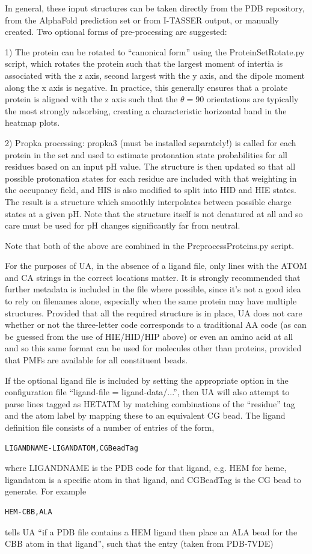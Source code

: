 \documentclass[10pt,a4paper,onecolumn]{report}
\begin{document}
In general, these input structures can be taken directly from the PDB repository, from the AlphaFold prediction set or from I-TASSER output, or manually created. Two optional forms of pre-processing are suggested:

1) The protein can be rotated to ``canonical form'' using the ProteinSetRotate.py script, which rotates the protein such that the largest moment of intertia is associated with the z axis, second largest with the y axis, and the dipole moment along the x axis is negative. In practice, this generally ensures that a prolate protein is aligned with the z axis such that the $\theta = 90$ orientations are typically the most strongly adsorbing, creating a characteristic horizontal band in the heatmap plots. 

2) Propka processing: propka3 (must be installed separately!) is called for each protein in the set and used to estimate protonation state probabilities for all residues based on an input pH value. The structure is then updated so that all possible protonation states for each residue are included with that weighting in the occupancy field, and HIS is also modified to split into HID and HIE states. The result is a structure which smoothly interpolates between possible charge states at a given pH. Note that the structure itself is not denatured at all and so care must be used for pH changes significantly far from neutral. 

Note that both of the above are combined in the PreprocessProteins.py script.

For the purposes of UA, in the absence of a ligand file, only lines with the ATOM and CA strings in the correct locations matter. It is strongly recommended that further metadata is included in the file where possible, since it's not a good idea to rely on filenames alone, especially when the same protein may have multiple structures. Provided that all the required structure is in place, UA does not care whether or not the three-letter code corresponds to a traditional AA code (as can be guessed from the use of HIE/HID/HIP above) or even an amino acid at all and so this same format can be used for molecules other than proteins, provided that PMFs are available for all constituent beads. 

If the optional ligand file is included by setting the appropriate option in the configuration file ``ligand-file = ligand-data/...'', then UA will also attempt to parse lines tagged as HETATM by matching combinations of the ``residue'' tag and the atom label by mapping these to an equivalent CG bead. The ligand definition file consists of a number of entries of the form,
\begin{lstlisting}
LIGANDNAME-LIGANDATOM,CGBeadTag
\end{lstlisting}
where LIGANDNAME is the PDB code for that ligand, e.g. HEM for heme, ligandatom is a specific atom in that ligand, and CGBeadTag is the CG bead to generate.  For example
\begin{lstlisting}
HEM-CBB,ALA
\end{lstlisting}
 tells UA ``if a PDB file contains a HEM ligand then place an ALA bead for the CBB atom in that ligand'', such that the entry (taken from PDB-7VDE)
\end{document}
